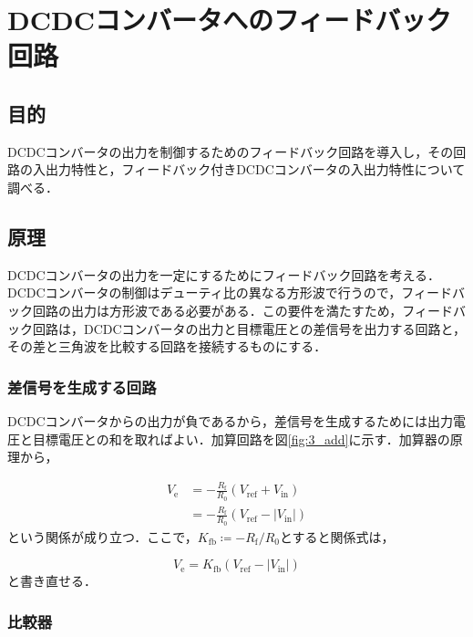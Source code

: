 \documentclass[1_power_supply.tex]{subfiles}
\begin{document}
\section{DCDCコンバータへのフィードバック回路}

  \subsection{目的}

    DCDCコンバータの出力を制御するためのフィードバック回路を導入し，その回路の入出力特性と，フィードバック付きDCDCコンバータの入出力特性について調べる．

  \subsection{原理}

    DCDCコンバータの出力を一定にするためにフィードバック回路を考える．DCDCコンバータの制御はデューティ比の異なる方形波で行うので，フィードバック回路の出力は方形波である必要がある．この要件を満たすため，フィードバック回路は，DCDCコンバータの出力と目標電圧との差信号を出力する回路と，その差と三角波を比較する回路を接続するものにする．

    \subsubsection{差信号を生成する回路}

      DCDCコンバータからの出力が負であるから，差信号を生成するためには出力電圧と目標電圧との和を取ればよい．加算回路を図\ref{fig:3_add}に示す．加算器の原理から，

      \begin{align}
        V_\mathrm{e} &= -\frac{R_\mathrm{f}}{R_0}(V_\mathrm{ref} + V_\mathrm{in})  \\
                     &= -\frac{R_\mathrm{f}}{R_0}(V_\mathrm{ref} - |V_\mathrm{in}|)
      \end{align}
      という関係が成り立つ．ここで，$K_\mathrm{fb} \coloneq -R_\mathrm{f}/R_0$とすると関係式は，

      \begin{equation}
        V_\mathrm{e} = K_\mathrm{fb}(V_\mathrm{ref} - |V_\mathrm{in}|)
      \end{equation}
      と書き直せる．

    \subsubsection{比較器}
\end{document}
